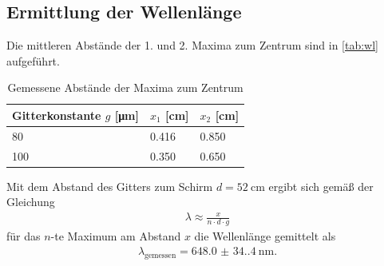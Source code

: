 \subsection{Ermittlung der Wellenlänge}
Die mittleren Abstände der 1. und 2. Maxima zum Zentrum sind in \autoref{tab:wl} aufgeführt.
\begin{table}[H]
  \centering
  \caption{Gemessene Abstände der Maxima zum Zentrum}
  \label{tab:wl}
  \begin{tabular}{l | l | l}
    \toprule
        {Gitterkonstante $g$ [\si{\micro\meter}]} & {$x_1$ [\si{\centi\meter}]} & {$x_2$ [\si{\centi\meter}]}\\
    \midrule
        80 & 0.416 & 0.850 \\
        100 & 0.350 & 0.650 \\
    \bottomrule
  \end{tabular}
\end{table}
Mit dem Abstand des Gitters zum Schirm $d=\SI{52}{\centi\meter}$ ergibt sich gemäß der Gleichung
\begin{align}
  \lambda\approx\frac{x}{n\cdot d\cdot g}
\end{align} 
für das $n$-te Maximum am Abstand $x$ die Wellenlänge gemittelt als
\begin{align}
  \lambda_\text{gemessen}=\SI{648.0(34.4)}{\nano\meter}\text{.}
\end{align} 